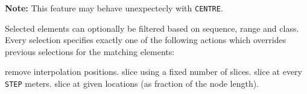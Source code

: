 
\textbf{Note:} This feature may behave unexpectecly with \texttt{CENTRE}.

Selected elements can optionally be filtered based on sequence, range and
class. Every selection specifies exactly one of the following actions which
overrides previous selections for the matching elements:

\begin{madlist}
   remove interpolation positions.
   slice using a fixed number of slices.
   slice at every \texttt{STEP} meters.
   slice at given locations (as fraction of the node length).
\end{madlist}


